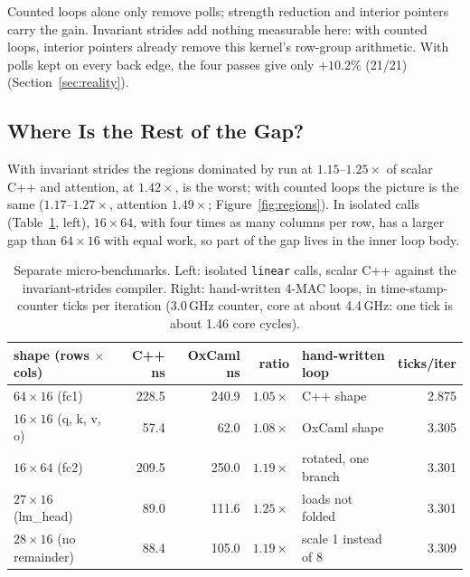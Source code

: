 Counted loops alone only remove polls; strength reduction and interior
pointers carry the gain. Invariant strides add nothing measurable here: with
counted loops, interior pointers already remove this kernel's row-group
arithmetic. With polls kept on every back edge, the four passes give only
$+10.2\%$ (21/21) (Section~\ref{sec:reality}).

\subsection{Where Is the Rest of the Gap?}
\label{sec:residual}
With invariant strides the regions dominated by  run at
$1.15$--$1.25\times$ of scalar C++ and attention, at $1.42\times$, is the
worst; with counted loops the picture is the same ($1.17$--$1.27\times$,
attention $1.49\times$; Figure~\ref{fig:regions}). In isolated calls
(Table~\ref{tab:shapes}, left), $16\times64$, with four times as many columns
per row, has a larger gap than $64\times16$ with equal work, so part of the
gap lives in the inner loop body.

\begin{table}[h]
  \centering
  \small
  \begin{tabular}{@{}lrrr@{\hspace{3em}}lr@{}}
    \toprule
    shape (rows $\times$ cols) & C++ ns & OxCaml ns & ratio & hand-written loop & ticks/iter \\
    \midrule
    $64\times16$ (fc1)      & 228.5 & 240.9 & $1.05\times$ & C++ shape & 2.875 \\
    $16\times16$ (q, k, v, o) & 57.4 & 62.0 & $1.08\times$ & OxCaml shape & 3.305 \\
    $16\times64$ (fc2)      & 209.5 & 250.0 & $1.19\times$ & \quad rotated, one branch & 3.301 \\
    $27\times16$ (lm\_head) & 89.0 & 111.6 & $1.25\times$ & \quad loads not folded & 3.301 \\
    $28\times16$ (no remainder) & 88.4 & 105.0 & $1.19\times$ & \quad scale 1 instead of 8 & 3.309 \\
    \bottomrule
  \end{tabular}
  \caption{Separate micro-benchmarks. Left: isolated \texttt{linear} calls,
  scalar C++ against the invariant-strides compiler. Right: hand-written 4-MAC
  loops, in time-stamp-counter ticks per iteration (3.0\,GHz counter, core at
  about 4.4\,GHz: one tick is about 1.46 core cycles).}
  \label{tab:shapes}
\end{table}

